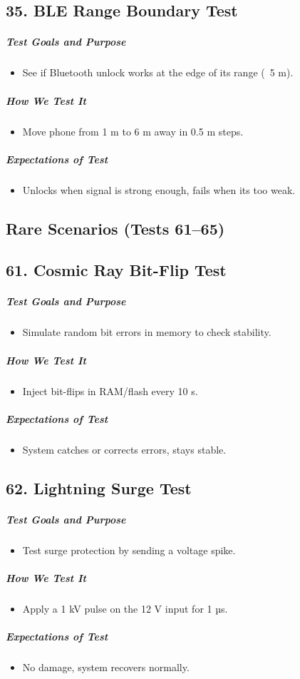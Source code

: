 \subsection*{35. BLE Range Boundary Test}
\subparagraph{Test Goals and Purpose}
\begin{itemize}
    \item See if Bluetooth unlock works at the edge of its range (~5 m).
\end{itemize}
\subparagraph{How We Test It}
\begin{itemize}
    \item Move phone from 1 m to 6 m away in 0.5 m steps.
\end{itemize}
\subparagraph{Expectations of Test}
\begin{itemize}
    \item Unlocks when signal is strong enough, fails when its too weak.
\end{itemize}

\newpage
\subsection*{Rare Scenarios (Tests 61–65)}

\subsection*{61. Cosmic Ray Bit-Flip Test}
\subparagraph{Test Goals and Purpose}
\begin{itemize}
    \item Simulate random bit errors in memory to check stability.
\end{itemize}
\subparagraph{How We Test It}
\begin{itemize}
    \item Inject bit-flips in RAM/flash every 10 s.
\end{itemize}
\subparagraph{Expectations of Test}
\begin{itemize}
    \item System catches or corrects errors, stays stable.
\end{itemize}

\subsection*{62. Lightning Surge Test}
\subparagraph{Test Goals and Purpose}
\begin{itemize}
    \item Test surge protection by sending a voltage spike.
\end{itemize}
\subparagraph{How We Test It}
\begin{itemize}
    \item Apply a 1 kV pulse on the 12 V input for 1 µs.
\end{itemize}
\subparagraph{Expectations of Test}
\begin{itemize}
    \item No damage, system recovers normally.
\end{itemize}

